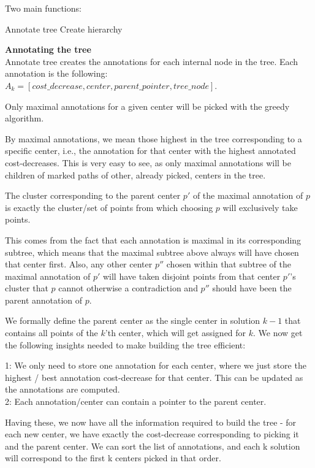 Two main functions:
\begin{outline}
    \1 Annotate tree
    \1 Create hierarchy
\end{outline}

\textbf{Annotating the tree}\\
Annotate tree creates the annotations for each internal node in the tree. Each annotation is the following:
$A_k = [cost\_decrease, center, parent\_pointer, tree\_node]$.
\begin{idea}
    Only maximal annotations for a given center will be picked with the greedy algorithm.
\end{idea}
By maximal annotations, we mean those highest in the tree corresponding to a specific center, i.e., the annotation for that center with the highest annotated cost-decreases. This is very easy to see, as only maximal annotations will be children of marked paths of other, already picked, centers in the tree.

\begin{idea}
    The cluster corresponding to the parent center $p'$ of the maximal annotation of $p$ is exactly the cluster/set of points from which choosing $p$ will exclusively take points.
\end{idea}
This comes from the fact that each annotation is maximal in its corresponding subtree, which means that the maximal subtree above always will have chosen that center first. Also, any other center $p''$ chosen within that subtree of the maximal annotation of $p'$ will have taken disjoint points from that center $p'$'s cluster that $p$ cannot otherwise a contradiction and $p''$ should have been the parent annotation of $p$.

We formally define the parent center as the single center in solution $k-1$ that contains all points of the $k$'th center, which will get assigned for $k$. We now get the following insights needed to make building the tree efficient: 

1: We only need to store one annotation for each center, where we just store the highest / best annotation cost-decrease for that center. This can be updated as the annotations are computed. \\
2: Each annotation/center can contain a pointer to the parent center. 

Having these, we now have all the information required to build the tree - for each new center, we have exactly the cost-decrease corresponding to picking it and the parent center. We can sort the list of annotations, and each k solution will correspond to the first k centers picked in that order.


